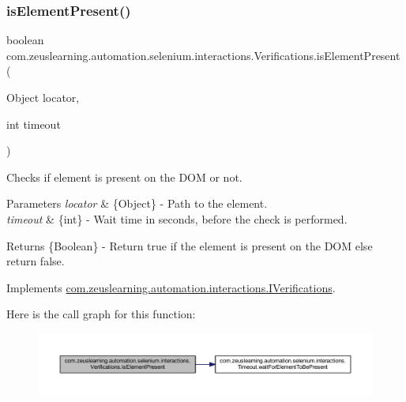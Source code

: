 \subsubsection{\texorpdfstring{is\+Element\+Present()}{isElementPresent()}\hspace{0.1cm}{\footnotesize\ttfamily [2/2]}}
{\footnotesize\ttfamily boolean com.\+zeuslearning.\+automation.\+selenium.\+interactions.\+Verifications.\+is\+Element\+Present (\begin{DoxyParamCaption}\item[{Object}]{locator,  }\item[{int}]{timeout }\end{DoxyParamCaption})\hspace{0.3cm}{\ttfamily [inline]}}

Checks if element is present on the D\+OM or not.


\begin{DoxyParams}{Parameters}
{\em locator} & \{Object\} -\/ Path to the element. \\
\hline
{\em timeout} & \{int\} -\/ Wait time in seconds, before the check is performed. \\
\hline
\end{DoxyParams}
\begin{DoxyReturn}{Returns}
\{Boolean\} -\/ Return {\ttfamily true} if the element is present on the D\+OM else return false. 
\end{DoxyReturn}


Implements \hyperlink{interfacecom_1_1zeuslearning_1_1automation_1_1interactions_1_1IVerifications_aacc6eef44a30e8e8e228229c31949a9c}{com.\+zeuslearning.\+automation.\+interactions.\+I\+Verifications}.

Here is the call graph for this function\+:
\nopagebreak
\begin{figure}[H]
\begin{center}
\leavevmode
\includegraphics[width=350pt]{d2/d6b/classcom_1_1zeuslearning_1_1automation_1_1selenium_1_1interactions_1_1Verifications_ace7cafb4b24bcba420f997a1bcc9ac6c_cgraph}
\end{center}
\end{figure}
\hypertarget{classcom_1_1zeuslearning_1_1automation_1_1selenium_1_1interactions_1_1Verifications_af83849f7939e2df11760140e6eea3eb0}{}\label{classcom_1_1zeuslearning_1_1automation_1_1selenium_1_1interactions_1_1Verifications_af83849f7939e2df11760140e6eea3eb0} 
